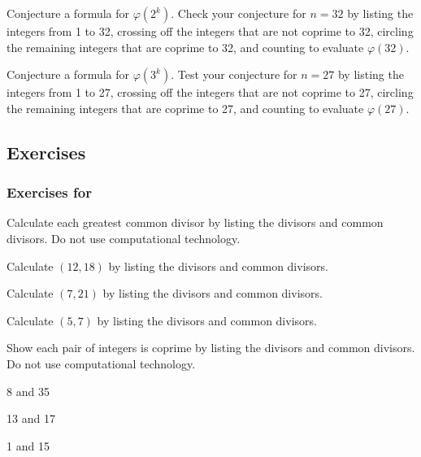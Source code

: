 \begin{act}
\begin{actpart}
        \item \label{part_phi_power2} Conjecture a formula for $\varphi(2^k)$.  Check your conjecture for $n=32$ by listing the integers from 1 to 32, crossing off the integers that are not coprime to 32, circling the remaining integers that are coprime to 32, and counting to evaluate $\varphi(32)$.

        \item \label{part_phi_power3} Conjecture a formula for $\varphi(3^k)$.  Test your conjecture for $n=27$ by listing the integers from 1 to 27, crossing off the integers that are not coprime to 27, circling the remaining integers that are coprime to 27, and counting to evaluate $\varphi(27)$.
        \end{actpart}
\end{act}


\subsection{Exercises}

\subsubsection*{Exercises for  \subgcd}

\begin{exer}[\exerP] %
\label{exer_gcd_listing_divisors}
    Calculate each greatest common divisor by listing the divisors and common divisors.  Do not use computational technology. 
        \begin{exerpart}
            \item Calculate $(12,18)$ by listing the divisors and common divisors.
            \item Calculate $(7,21)$ by listing the divisors and common divisors.
            \item Calculate $(5,7)$ by listing the divisors and common divisors.
        \end{exerpart}
\end{exer}

\begin{exer}[\exerP] %
\label{exer_coprime_listing_divisors}
    Show each pair of integers is coprime by listing the divisors and common divisors.  Do not use computational technology. 
    \begin{exerpart}
        \item 8 and 35
        \item 13 and 17
        \item 1 and 15
    \end{exerpart}
\end{exer}

